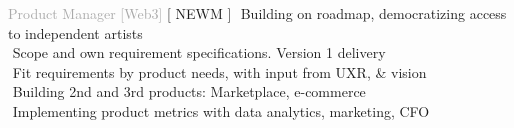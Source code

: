 
    
\begin{cvtable}

    {\textcolor{darkgray}{
    Product 
    Manager
    [Web3] 
    }}%
    {[ {N\scriptsize EWM} ]}%
    {%
     \textperiodcentered $ $ Building on roadmap, democratizing access to independent artists \\
     \textperiodcentered $ $ Scope and own requirement specifications. Version 1 delivery \\
     \textperiodcentered $ $ Fit requirements by product needs, with input from UXR, \& vision \\
     \textperiodcentered $ $ Building 2nd and 3rd products: Marketplace, e-commerce \\
     \textperiodcentered $ $ Implementing product metrics with data analytics, marketing, CFO \\
}


\end{cvtable}
